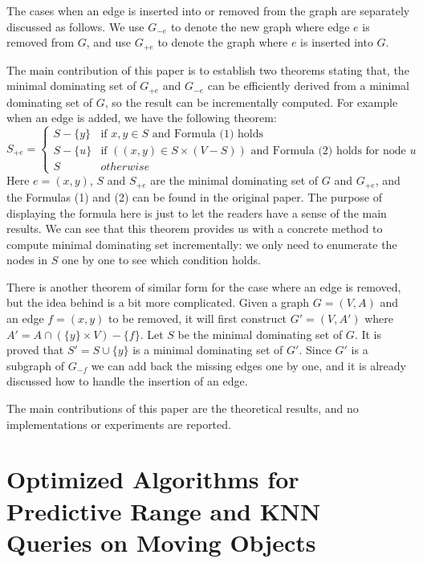 \documentclass[paper=a4, fontsize=18pt]{article} %
\numberwithin{equation}{section} %
\numberwithin{figure}{section} %
\numberwithin{table}{section} %
\begin{document}
The cases when an edge is inserted into or removed from the graph are separately discussed as follows. We use $G_{-e}$ to denote the new graph where edge $e$ is removed from $G$, and use $G_{+e}$ to denote the graph where $e$ is inserted into $G$.

The main contribution of this paper is to establish two theorems stating that, the minimal dominating set of $G_{+e}$ and $G_{-e}$ can be efficiently derived from a minimal dominating set of $G$, so the result can be incrementally computed. For example when an edge is added, we have the following theorem:
\[
S_{+e}=
\begin{cases}
S-\{y\} & \mbox{if } x,y \in S \mbox{ and Formula (1) holds}\\
S-\{u\} & \mbox{if } ((x,y) \in S \times (V-S)) \mbox{ and Formula (2) holds for node } u\\
S & otherwise
\end{cases}
\]
Here $e=(x,y)$, $S$ and $S_{+e}$ are the minimal dominating set of $G$ and $G_{+e}$, and the Formulas (1) and (2) can be found in the original paper. The purpose of displaying the formula here is just to let the readers have a sense of the main results. We can see that this theorem provides us with a concrete method to compute minimal dominating set incrementally: we only need to enumerate the nodes in $S$ one by one to see which condition holds.

There is another theorem of similar form for the case where an edge is removed, but the idea behind is a bit more complicated. Given a graph $G = (V, A)$ and an edge $f = (x,y)$ to be removed, it will first construct $G' = (V,A')$ where $A' = A \cap (\{y\} \times V) - \{f\}$. Let $S$ be the minimal dominating set of $G$. It is proved that $S' = S \cup \{y\}$ is a minimal dominating set of $G'$. Since $G'$ is a subgraph of $G_{-f}$ we can add back the missing edges one by one, and it is already discussed how to handle the insertion of an edge.

The main contributions of this paper are the theoretical results, and no implementations or experiments are reported.


\section{Optimized Algorithms for Predictive Range and KNN Queries on Moving Objects \cite{ZJDR10}}
\end{document}
